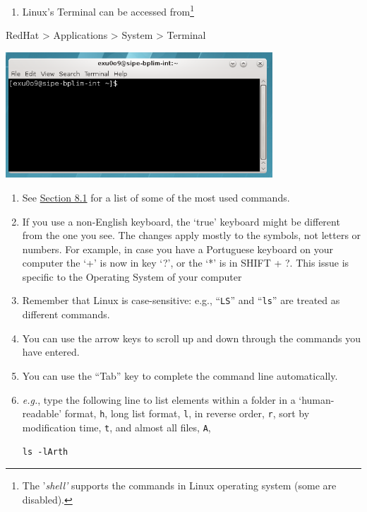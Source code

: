 \documentclass[
  11pt,
  a4paper,
]{article}
\providecommand{\tightlist}{%
  \setlength{\itemsep}{0pt}\setlength{\parskip}{0pt}}
\begin{document}
\begin{enumerate}
\def\labelenumi{\arabic{enumi}.}
\tightlist
\item
  Linux's Terminal can be accessed from\footnote{The '\emph{shell'}
    supports the commands in Linux operating system (some are disabled).}
\end{enumerate}

RedHat \textgreater{} Applications \textgreater{} System \textgreater{}
Terminal

\includegraphics[width=3.93701in,height=1.84868in]{./media/image9.png}

\begin{enumerate}
\def\labelenumi{\arabic{enumi}.}
\setcounter{enumi}{1}
\item
  See \protect\hyperlink{shell_commands}{Section 8.1} for a list of some
  of the most used commands.
\item
  If you use a non-English keyboard, the `true' keyboard might be
  different from the one you see. The changes apply mostly to the
  symbols, not letters or numbers. For example, in case you have a
  Portuguese keyboard on your computer the `+' is now in key `?', or the
  `*' is in SHIFT + ?. This issue is specific to the Operating System of
  your computer
\item
  Remember that Linux is case-sensitive: e.g., ``\texttt{LS}'' and
  ``\texttt{ls}'' are treated as different commands.
\item
  You can use the arrow keys to scroll up and down through the commands
  you have entered.
\item
  You can use the ``Tab'' key to complete the command line
  automatically.
\item
  \emph{e.g.}, type the following line to list elements within a folder
  in a `human-readable' format, \texttt{h}, long list format,
  \texttt{l}, in reverse order, \texttt{r}, sort by modification time,
  \texttt{t}, and almost all files, \texttt{A},

  \texttt{ls\ -lArth}
\end{enumerate}
\end{document}
